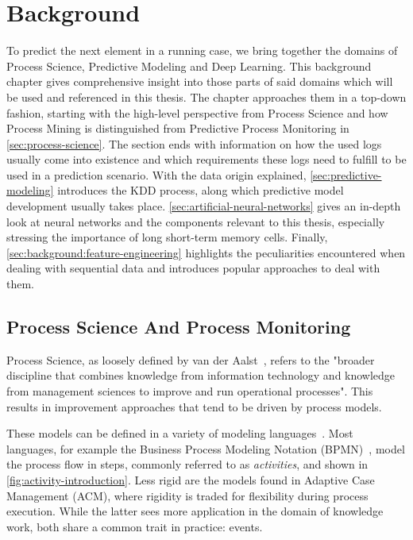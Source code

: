\chapter{Background}\label{chap:background}
To predict the next element in a running case, we bring together the domains of Process Science, Predictive Modeling and Deep Learning. This background chapter gives comprehensive insight into those parts of said domains which will be used and referenced in this thesis. The chapter approaches them in a top-down fashion, starting with the high-level perspective from Process Science and how Process Mining is distinguished from Predictive Process Monitoring in \autoref{sec:process-science}. The section ends with information on how the used logs usually come into existence and which requirements these logs need to fulfill to be used in a prediction scenario.
With the data origin explained, \autoref{sec:predictive-modeling} introduces the KDD process, along which predictive model development usually takes place.
\autoref{sec:artificial-neural-networks} gives an in-depth look at neural networks and the components relevant to this thesis, especially stressing the importance of long short-term memory cells.
Finally, \autoref{sec:background:feature-engineering} highlights the peculiarities encountered when dealing with sequential data and introduces popular approaches to deal with them.

\section{Process Science And Process Monitoring}\label{sec:process-science}
Process Science, as loosely defined by van der Aalst~\cite{Aalst2016}, refers to the "broader discipline that combines knowledge from information technology and knowledge from management sciences to improve and run operational processes". This results in improvement approaches that tend to be driven by process models.

These models can be defined in a variety of modeling languages~\cite{panagacos2012ultimate}. Most languages, for example the Business Process Modeling Notation (BPMN)~\cite{bpmn2.0}, model the process flow in steps, commonly referred to as \textit{activities}, and shown in \autoref{fig:activity-introduction}. Less rigid are the models found in Adaptive Case Management (ACM), where rigidity is traded for flexibility during process execution. While the latter sees more application in the domain of knowledge work, both share a common trait in practice: events.

